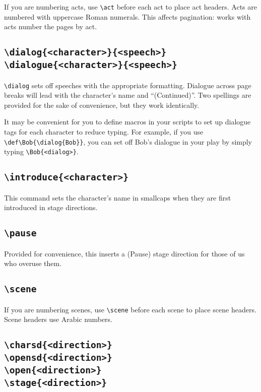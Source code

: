 \documentclass{report}
\begin{document}
If you are numbering acts, use \verb|\act| before each act to place act headers. Acts are numbered with uppercase Roman numerals. This affects pagination: works with acts number the pages by act.

\cprotect\subsection[\verb|\dialog{<character>}{<speech>}| \verb|\dialogue{<character>}{<speech>}|]{\verb|\dialog{<character>}{<speech>}|\\\verb|\dialogue{<character>}{<speech>}|}

\verb|\dialog| sets off speeches with the appropriate formatting. Dialogue across page breaks will lead with the character’s name and “(Continued)”. Two spellings are provided for the sake of convenience, but they work identically.

It may be convenient for you to define macros in your scripts to set up dialogue tags for each character to reduce typing. For example, if you use \verb|\def\Bob{\dialog{Bob}}|, you can set off Bob’s dialogue in your play by simply typing \verb|\Bob{<dialog>}|.

\cprotect\subsection{\verb|\introduce{<character>}|}

This command sets the character’s name in smallcaps when they are first introduced in stage directions.

\cprotect\subsection{\verb|\pause|}

Provided for convenience, this inserts a (Pause) stage direction for those of us who overuse them.

\cprotect\subsection{\verb|\scene|}

If you are numbering scenes, use \verb|\scene| before each scene to place scene headers. Scene headers use Arabic numbers.

\cprotect\subsection[\verb|\charsd{<direction>}|  \verb|\opensd{<direction>}| \verb|\open{<direction>}| \verb|\stage{<direction>}|]{\verb|\charsd{<direction>}|\\\verb|\opensd{<direction>}|\\\verb|\open{<direction>}|\\\verb|\stage{<direction>}|}
\end{document}
